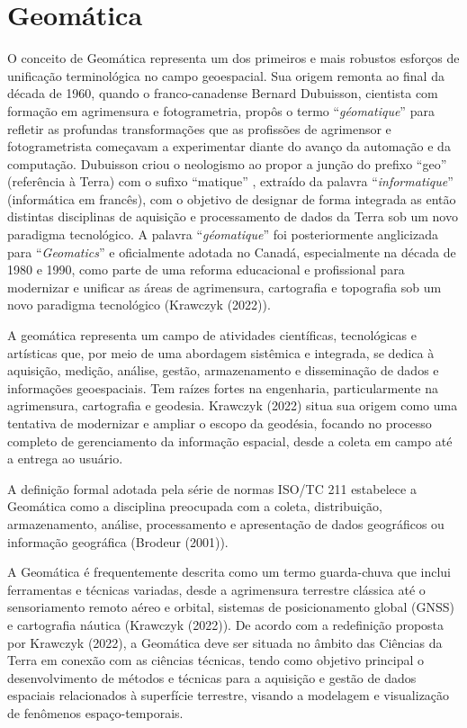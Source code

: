 \documentclass[
  letterpaper,
  DIV=11,
  numbers=noendperiod]{scrreprt}
\begin{document}
\section{Geomática}\label{geomuxe1tica}

O conceito de Geomática representa um dos primeiros e mais robustos
esforços de unificação terminológica no campo geoespacial. Sua origem
remonta ao final da década de 1960, quando o franco-canadense Bernard
Dubuisson, cientista com formação em agrimensura e fotogrametria, propôs
o termo ``\emph{géomatique}'' para refletir as profundas transformações
que as profissões de agrimensor e fotogrametrista começavam a
experimentar diante do avanço da automação e da computação. Dubuisson
criou o neologismo ao propor a junção do prefixo ``geo'' (referência à
Terra) com o sufixo ``matique'' , extraído da palavra
``\emph{informatique}'' (informática em francês), com o objetivo de
designar de forma integrada as então distintas disciplinas de aquisição
e processamento de dados da Terra sob um novo paradigma tecnológico. A
palavra ``\emph{géomatique}'' foi posteriormente anglicizada para
``\emph{Geomatics}'' e oficialmente adotada no Canadá, especialmente na
década de 1980 e 1990, como parte de uma reforma educacional e
profissional para modernizar e unificar as áreas de agrimensura,
cartografia e topografia sob um novo paradigma tecnológico (Krawczyk
(2022)).

A geomática representa um campo de atividades científicas, tecnológicas
e artísticas que, por meio de uma abordagem sistêmica e integrada, se
dedica à aquisição, medição, análise, gestão, armazenamento e
disseminação de dados e informações geoespaciais. Tem raízes fortes na
engenharia, particularmente na agrimensura, cartografia e geodesia.
Krawczyk (2022) situa sua origem como uma tentativa de modernizar e
ampliar o escopo da geodésia, focando no processo completo de
gerenciamento da informação espacial, desde a coleta em campo até a
entrega ao usuário.

A definição formal adotada pela série de normas ISO/TC 211 estabelece a
Geomática como a disciplina preocupada com a coleta, distribuição,
armazenamento, análise, processamento e apresentação de dados
geográficos ou informação geográfica (Brodeur (2001)).

A Geomática é frequentemente descrita como um termo guarda-chuva que
inclui ferramentas e técnicas variadas, desde a agrimensura terrestre
clássica até o sensoriamento remoto aéreo e orbital, sistemas de
posicionamento global (GNSS) e cartografia náutica (Krawczyk (2022)). De
acordo com a redefinição proposta por Krawczyk (2022), a Geomática deve
ser situada no âmbito das Ciências da Terra em conexão com as ciências
técnicas, tendo como objetivo principal o desenvolvimento de métodos e
técnicas para a aquisição e gestão de dados espaciais relacionados à
superfície terrestre, visando a modelagem e visualização de fenômenos
espaço-temporais.
\end{document}
